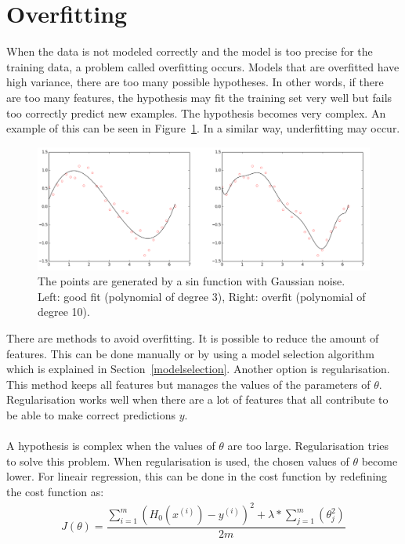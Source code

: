 \section{Overfitting}
\label{overfitting}
When the data is not modeled correctly and the model is too precise for the training data, a problem called overfitting occurs. Models that are overfitted have high variance, there are too many possible hypotheses. In other words, if there are too many features, the hypothesis may fit the training set very well but fails too correctly predict new examples. The hypothesis becomes very complex. An example of this can be seen in Figure~\ref{fig:overfitting}. In a similar way, underfitting may occur. 
\begin{figure}[H]
\centering
\includegraphics[width=1\textwidth]{Figures/overfit}
\decoRule
\caption[Overfitting]{The points are generated by a sin function with Gaussian noise. Left: good fit (polynomial of degree 3), Right: overfit (polynomial of degree 10). \cite{overfit-fig}}
\label{fig:overfitting}
\end{figure}
\noindent There are methods to avoid overfitting. It is possible to reduce the amount of features.  This can be done manually or by using a model selection algorithm which is explained in Section~\ref{modelselection}. Another option is regularisation. This method keeps all features but manages the values of the parameters of $\theta$.  Regularisation works well when there are a lot of features that all contribute to be able to make correct predictions $y$.\\
\\
A hypothesis is complex when the values of $\theta$ are too large. Regularisation tries to solve this problem. When regularisation is used, the chosen values of $\theta$ become lower. For lineair regression, this can be done in the cost function by redefining the cost function as:
\begin{align}
J(\theta) = \dfrac{\sum\limits_{i=1}^m(H_0(x^{(i)}) - y^{(i)})^2 + \lambda * \sum\limits_{j=1}^m(\theta_j^2)}{2m}
\end{align}
